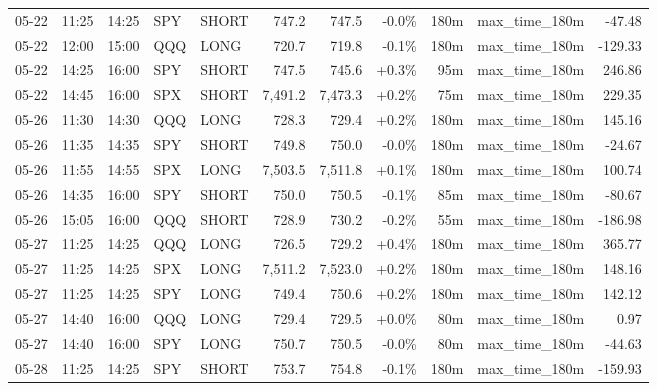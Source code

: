 \documentclass[11pt,a4paper,twoside]{article}
\begin{document}
\begin{center}
\begin{longtable}{>{\color{txtmain}}l l l l l r r r r >{\color{txtmain}}l r}
05-22 & 11:25 & 14:25 & SPY & SHORT & 747.2 & 747.5 & \textcolor{lossred}{-0.0\%} & 180m & max\_time\_180m & \textcolor{lossred}{-47.48} \\
05-22 & 12:00 & 15:00 & QQQ & LONG & 720.7 & 719.8 & \textcolor{lossred}{-0.1\%} & 180m & max\_time\_180m & \textcolor{lossred}{-129.33} \\
05-22 & 14:25 & 16:00 & SPY & SHORT & 747.5 & 745.6 & \textcolor{wingreen}{+0.3\%} & 95m & max\_time\_180m & \textcolor{wingreen}{246.86} \\
05-22 & 14:45 & 16:00 & SPX & SHORT & 7,491.2 & 7,473.3 & \textcolor{wingreen}{+0.2\%} & 75m & max\_time\_180m & \textcolor{wingreen}{229.35} \\
05-26 & 11:30 & 14:30 & QQQ & LONG & 728.3 & 729.4 & \textcolor{wingreen}{+0.2\%} & 180m & max\_time\_180m & \textcolor{wingreen}{145.16} \\
05-26 & 11:35 & 14:35 & SPY & SHORT & 749.8 & 750.0 & \textcolor{lossred}{-0.0\%} & 180m & max\_time\_180m & \textcolor{lossred}{-24.67} \\
05-26 & 11:55 & 14:55 & SPX & LONG & 7,503.5 & 7,511.8 & \textcolor{wingreen}{+0.1\%} & 180m & max\_time\_180m & \textcolor{wingreen}{100.74} \\
05-26 & 14:35 & 16:00 & SPY & SHORT & 750.0 & 750.5 & \textcolor{lossred}{-0.1\%} & 85m & max\_time\_180m & \textcolor{lossred}{-80.67} \\
05-26 & 15:05 & 16:00 & QQQ & SHORT & 728.9 & 730.2 & \textcolor{lossred}{-0.2\%} & 55m & max\_time\_180m & \textcolor{lossred}{-186.98} \\
05-27 & 11:25 & 14:25 & QQQ & LONG & 726.5 & 729.2 & \textcolor{wingreen}{+0.4\%} & 180m & max\_time\_180m & \textcolor{wingreen}{365.77} \\
05-27 & 11:25 & 14:25 & SPX & LONG & 7,511.2 & 7,523.0 & \textcolor{wingreen}{+0.2\%} & 180m & max\_time\_180m & \textcolor{wingreen}{148.16} \\
05-27 & 11:25 & 14:25 & SPY & LONG & 749.4 & 750.6 & \textcolor{wingreen}{+0.2\%} & 180m & max\_time\_180m & \textcolor{wingreen}{142.12} \\
05-27 & 14:40 & 16:00 & QQQ & LONG & 729.4 & 729.5 & \textcolor{wingreen}{+0.0\%} & 80m & max\_time\_180m & \textcolor{wingreen}{0.97} \\
05-27 & 14:40 & 16:00 & SPY & LONG & 750.7 & 750.5 & \textcolor{lossred}{-0.0\%} & 80m & max\_time\_180m & \textcolor{lossred}{-44.63} \\
05-28 & 11:25 & 14:25 & SPY & SHORT & 753.7 & 754.8 & \textcolor{lossred}{-0.1\%} & 180m & max\_time\_180m & \textcolor{lossred}{-159.93} \\

\end{longtable}
\end{center}
\end{document}
